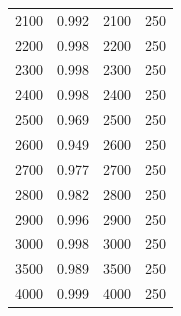 \begin{table}[H]
\begin{center}
\begin{scriptsize}
\begin{tabular}{lccc}
                2100            & 0.992     & 2100          & 250 \\
                2200            & 0.998     & 2200          & 250 \\
                2300            & 0.998     & 2300          & 250 \\
                2400            & 0.998     & 2400          & 250 \\
                2500            & 0.969     & 2500          & 250 \\
                2600            & 0.949     & 2600          & 250 \\
                2700            & 0.977     & 2700          & 250 \\
                2800            & 0.982     & 2800          & 250 \\
                2900            & 0.996     & 2900          & 250 \\
                3000            & 0.998     & 3000          & 250 \\
                3500            & 0.989     & 3500          & 250 \\
                4000            & 0.999     & 4000          & 250 \\ \hline\hline
            \end{tabular}
            \label{tab:cutlog}
        \end{scriptsize}
    \end{center}
\end{table}


